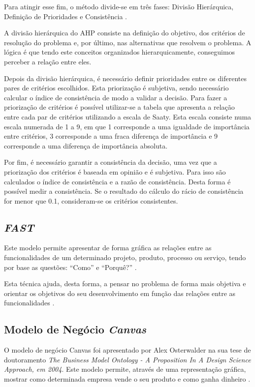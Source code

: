 Para atingir esse fim, o método divide-se em três fases: Divisão Hierárquica, Definição de Prioridades e Consistência \cite{ahp}.

A divisão hierárquica do \acrshort{AHP} consiste na definição do objetivo, dos critérios de resolução do problema e, por último, nas alternativas que resolvem o problema. A lógica é que tendo este conceitos organizados hierarquicamente, conseguimos perceber a relação entre eles.

Depois da divisão hierárquica, é necessário definir prioridades entre os diferentes pares de critérios escolhidos. Esta priorização é subjetiva, sendo necessário calcular o índice de consistência de modo a validar a decisão. Para fazer a priorização de critérios é possível utilizar-se a tabela que apresenta a relação entre cada par de critérios utilizando a escala de Saaty. Esta escala consiste numa escala numerada de 1 a 9, em que 1 corresponde a uma igualdade de importância entre critérios, 3 corresponde a uma fraca diferença de importância e 9 corresponde a uma diferença de importância absoluta.

Por fim, é necessário garantir a consistência da decisão, uma vez que a priorização dos critérios é baseada em opinião e é subjetiva. Para isso são calculados o índice de consistência e a razão de consistência. Desta forma é possível medir a consistência. Se o resultado do cálculo do rácio de consistência for menor que 0.1, consideram-se os critérios consistentes.

\subsection{\emph{\acrfull{FAST}}}

Este modelo permite apresentar de forma gráfica as relações entre as funcionalidades de um determinado projeto, produto, processo ou serviço, tendo por base as questões: “Como” e “Porquê?” \cite{fast}.

Esta técnica ajuda, desta forma, a pensar no problema de forma mais objetiva e orientar os objetivos do seu desenvolvimento em função das relações entre as funcionalidades \cite{fast}.


\subsection{Modelo de Negócio \emph{Canvas}}

O modelo de negócio Canvas foi apresentado por Alex Osterwalder na sua tese de doutoramento \emph{The Business Model Ontology - A Proposition In A Design Science Approach, em 2004}. Este modelo permite, através de uma representação gráfica, mostrar como determinada empresa vende o seu produto  e como ganha dinheiro \cite{canvas}.

